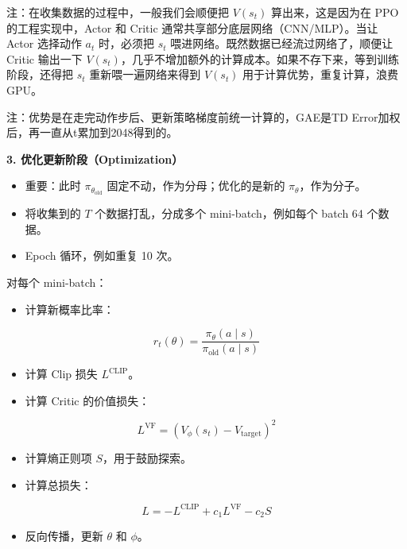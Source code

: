 注：在收集数据的过程中，一般我们会顺便把 \(V(s_t)\) 算出来，这是因为在 PPO 的工程实现中，Actor 和 Critic 通常共享部分底层网络（CNN/MLP）。当让 Actor 选择动作 \(a_t\) 时，必须把 \(s_t\) 喂进网络。既然数据已经流过网络了，顺便让 Critic 输出一下 \(V(s_t)\)，几乎不增加额外的计算成本。如果不存下来，等到训练阶段，还得把 \(s_t\) 重新喂一遍网络来得到 \(V(s_t)\) 用于计算优势，重复计算，浪费 GPU。

注：优势是在走完动作步后、更新策略梯度前统一计算的，GAE是TD Error加权后，再一直从t累加到2048得到的。

\textbf{3. 优化更新阶段（Optimization）}

\begin{itemize}
\tightlist
\item
  重要：此时 \(\pi_{\theta_{\mathrm{old}}}\) 固定不动，作为分母；优化的是新的 \(\pi_\theta\)，作为分子。
\item
  将收集到的 \(T\) 个数据打乱，分成多个 mini-batch，例如每个 batch 64 个数据。
\item
  Epoch 循环，例如重复 10 次。
\end{itemize}

对每个 mini-batch：

\begin{itemize}
\tightlist
\item
{}
  计算新概率比率：
\end{itemize}

\[
r_t(\theta)=\frac{\pi_\theta(a\mid s)}{\pi_{\mathrm{old}}(a\mid s)}
\]

\begin{itemize}
\tightlist
\item
  计算 Clip 损失 \(L^{\mathrm{CLIP}}\)。
\item
{}
  计算 Critic 的价值损失：
\end{itemize}

\[
L^{\mathrm{VF}}=\left(V_\phi(s_t)-V_{\mathrm{target}}\right)^{2}
\]

\begin{itemize}
\tightlist
\item
  计算熵正则项 \(S\)，用于鼓励探索。
\item
{}
  计算总损失：
\end{itemize}

\[
L=-L^{\mathrm{CLIP}}+c_1L^{\mathrm{VF}}-c_2S
\]

\begin{itemize}
\tightlist
\item
  反向传播，更新 \(\theta\) 和 \(\phi\)。
\end{itemize}

